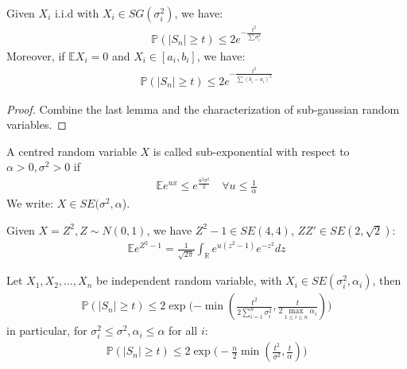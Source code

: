 \begin{theorem}
	Given $X_i$ i.i.d with $X_i \in SG(\sigma_i^2)$, we have:
	\begin{align*}
		\mathbb{P}(|S_n| \geq t) \leq 2e^{-\frac{t^2}{\sum\sigma_i^2}} 
	\end{align*}
	Moreover, if $\mathbb{E}X_i = 0$ and $X_i \in [a_i, b_i]$, we have:
	\begin{align*}
		\mathbb{P}(|S_n| \geq t) \leq 2e^{-\frac{t^2}{\sum(b_i - a_i)^2}}
	\end{align*}
\end{theorem}
\begin{proof}
	Combine the last lemma and the characterization of sub-gaussian random variables.
\end{proof}

\begin{definition}
	A centred random variable $X$ is called sub-exponential with respect to $\alpha > 0, \sigma^2 > 0$ if
\begin{align*}
	\mathbb{E} e^{ux} \leq e^{\frac{u^2 \sigma^2}{2}} \quad \forall u \le \frac{1}{\alpha}
\end{align*}
We write: $X \in SE(\sigma^2, \alpha$).
\end{definition}

\begin{example}
	Given $X = Z^2, Z\sim N(0, 1)$, we have $Z^2 - 1 \in SE(4, 4)$, $ZZ' \in SE(2, \sqrt{2})$:
	\begin{align*}
		\mathbb{E}e^{Z^2 - 1} = \frac{1}{\sqrt{2\pi}} \int_\mathbb{R} e^{u(z^2 - 1)}e^{-z^2}dz
	\end{align*}
\end{example}

\begin{proposition}
\end{proposition}

\begin{proposition}
\end{proposition}

\begin{theorem}
Let $X_1, X_2, \dots, X_n$ be independent random variable, with $X_i \in SE(\sigma_i^2, \alpha_i)$, then
\begin{align*}
	\mathbb{P}(|S_n| \ge t ) \le 2 \exp \bigg( {-\min(\frac{t^2}{2\sum_{i = 1}^n \sigma_i^2}, \frac{t}{2\max_{1 \le i \le n} \alpha_i})}\bigg)
\end{align*}
in particular, for $\sigma_i^2 \le \sigma^2, \alpha_i \le \alpha$ for all $i$:
\begin{align*}
	\mathbb{P}(|S_n| \ge t) \le 2 \exp\bigg(-\frac{n}{2} \min(\frac{t^2}{\sigma^2}, \frac{t}{\alpha}) \bigg)
\end{align*}
\end{theorem}

